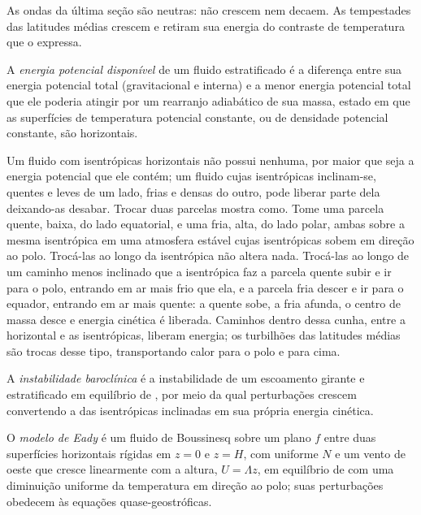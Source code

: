 As ondas da última seção são neutras: não crescem nem decaem.
As tempestades das latitudes médias crescem e retiram sua energia do
contraste de temperatura que o  expressa.

\begin{definition}\label{def:b3:atmospheric-dynamics:ape}
A \emph{energia potencial disponível} de
um fluido estratificado é a diferença entre sua energia potencial total
(gravitacional e interna) e a menor energia potencial total que ele poderia
atingir por um rearranjo adiabático de sua massa, estado em que as superfícies
de temperatura potencial constante, ou de densidade potencial constante, são
horizontais.
\end{definition}

Um fluido com isentrópicas horizontais não possui nenhuma, por maior que seja a
energia potencial que ele contém; um fluido cujas isentrópicas inclinam-se, quentes e leves de um lado, frias
e densas do outro, pode liberar parte dela deixando-as desabar. Trocar
duas parcelas mostra como. Tome uma parcela quente, baixa, do lado equatorial, e
uma fria, alta, do lado polar, ambas sobre a mesma isentrópica em uma atmosfera estável
cujas isentrópicas sobem em direção ao polo. Trocá-las ao longo da isentrópica não
altera nada. Trocá-las ao longo de um caminho menos inclinado que a isentrópica
faz a parcela quente subir e ir para o polo, entrando em ar mais frio que
ela, e a parcela fria descer e ir para o equador, entrando em ar mais quente: a
quente sobe, a fria afunda, o centro de massa desce e energia cinética é liberada.
Caminhos dentro dessa cunha, entre a horizontal e as isentrópicas, liberam
energia; os turbilhões das latitudes médias são trocas desse tipo, transportando
calor para o polo e para cima.

\begin{definition}\label{def:b3:atmospheric-dynamics:baroclinic-instability}
A \emph{instabilidade baroclínica} é a
instabilidade de um escoamento girante e estratificado em equilíbrio de , por meio da qual
perturbações crescem convertendo a  das
isentrópicas inclinadas em sua própria energia cinética.
\end{definition}

\begin{definition}\label{def:b3:atmospheric-dynamics:eady}
O \emph{modelo de Eady} é um fluido de Boussinesq sobre um
plano $f$ entre duas superfícies horizontais rígidas em $z = 0$ e $z = H$, com  uniforme $N$ e um vento de oeste que cresce linearmente com a altura,
$U = \Lambda z$, em equilíbrio de  com uma diminuição uniforme da
temperatura em direção ao polo; suas perturbações obedecem às equações
quase-geostróficas.
\end{definition}

